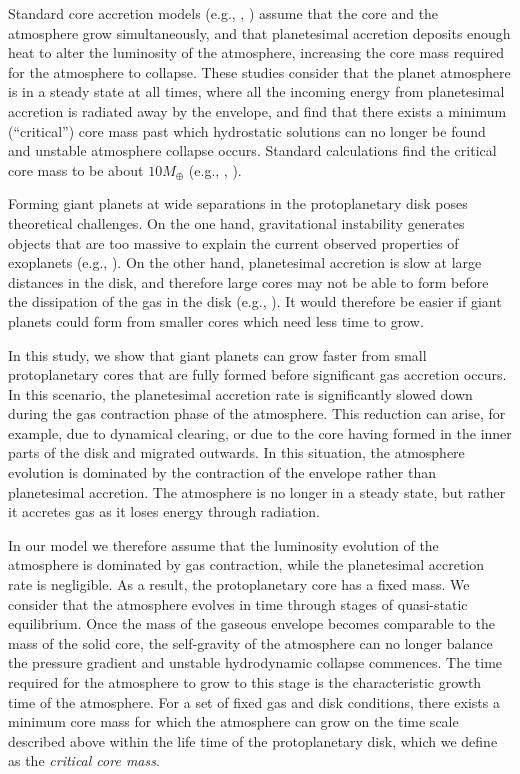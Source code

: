 \documentclass[apj]{emulateapj}
\begin{document}
Standard core accretion models (e.g., \citealt{stevenson82}, \citealt{rafikov06}) assume that the core and the atmosphere grow simultaneously, and that planetesimal accretion deposits enough heat to alter the luminosity of the atmosphere, increasing the core mass required for the atmosphere to collapse. These studies consider that the planet atmosphere is in a steady state at all times, where all the incoming energy from planetesimal accretion is radiated away by the envelope, and  find that there exists a minimum (``critical'') core mass past which hydrostatic solutions can no longer be found and unstable atmosphere collapse occurs.  Standard calculations find the critical core mass to be about $10 M_{\oplus}$ (e.g., \citealt{stevenson82}, \citealt{rafikov06}).

Forming giant planets at wide separations in the protoplanetary disk poses theoretical challenges. On the one hand, gravitational instability generates objects that are too massive to explain the current observed properties of exoplanets (e.g., \citealt{rafikov05}). On the other hand, planetesimal accretion is slow at large distances in the disk, and therefore large cores may not be able to form before the dissipation of the gas in the disk (e.g., \citealt{rafikov06}). It would therefore be easier if giant planets could form from smaller cores which need less time to grow. 

In this study, we show that giant planets can grow faster from small protoplanetary cores that are fully formed before significant gas accretion occurs. In this scenario, the planetesimal accretion rate is significantly slowed down during the gas contraction phase of the atmosphere. This reduction can arise, for example, due to dynamical clearing, or due to the core having formed in the inner parts of the disk and migrated outwards. In this situation, the atmosphere evolution is dominated by the contraction of the envelope rather than planetesimal accretion. The atmosphere is no longer in a steady state, but rather it accretes gas as it loses energy through radiation. 

In our model we therefore assume that the luminosity evolution of the atmosphere is dominated by gas contraction, while the planetesimal accretion rate is negligible. As a result, the protoplanetary core has a fixed mass. We consider that the atmosphere evolves in time through stages of quasi-static equilibrium. Once the mass of the gaseous envelope becomes comparable to the mass of the solid core, the self-gravity of the atmosphere can no longer balance the pressure gradient and unstable hydrodynamic collapse commences. The time required for the atmosphere to grow to this stage is the characteristic growth time of the atmosphere. For a set of fixed gas and disk conditions, there exists a minimum core mass for which the atmosphere can grow on the time scale described above within the life time of the protoplanetary disk, which we define as the \textit{critical core mass}. 
\end{document}
